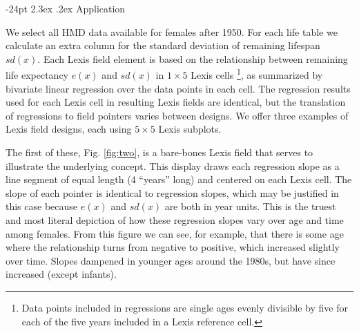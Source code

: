 \documentclass[10pt, twoside, parskip=half]{article}
\makeatletter
\renewcommand\section{\@startsection {section}{1}{\z@}%
                                   {-24pt}%
                                   {2.3ex \@plus.2ex}%
                                   {\normalfont\large\bfseries}}
\makeatother
\begin{document}
\hypertarget{application}{%
\section{Application}\label{application}}

We select all HMD data available for females after 1950. For each life table we calculate an extra column for the standard deviation of remaining lifespan \(sd(x)\). Each Lexis field element is based on the relationship between remaining life expectancy \(e(x)\) and \(sd(x)\) in \(1\times 5\) Lexis cells \footnote{Data points included in regressions are single ages evenly divisible by five for each of the five years included in a Lexis reference cell.}, as summarized by bivariate linear regression over the data points in each cell. The regression results used for each Lexis cell in resulting Lexis fields are identical, but the translation of regressions to field pointers varies between designs. We offer three examples of Lexis field designs, each using \(5\times 5\) Lexis subplots.

The first of these, Fig. \ref{fig:two}, is a bare-bones Lexis field that serves to illustrate the underlying concept. This display draws each regression slope as a line segment of equal length (4 ``years'' long) and centered on each Lexis cell. The slope of each pointer is identical to regression slopes, which may be justified in this case because \(e(x)\) and \(sd(x)\) are both in year units. This is the truest and most literal depiction of how these regression slopes vary over age and time among females. From this figure we can see, for example, that there is some age where the relationship turns from negative to positive, which increased slightly over time. Slopes dampened in younger ages around the 1980s, but have since increased (except infants).
\end{document}
